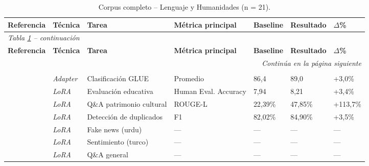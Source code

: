 \begin{longtable}{p{3.5cm} p{1.7cm} p{3.0cm} p{1.8cm} p{1.3cm} p{1.3cm} p{0.9cm}}
\caption{Corpus completo -- Lenguaje y Humanidades (n = 21).} \label{tab:apx_lh} \\
\toprule
\scriptsize\textbf{Referencia} & \scriptsize\textbf{Técnica} & \scriptsize\textbf{Tarea} & \scriptsize\textbf{Métrica principal} & \scriptsize\textbf{Baseline} & \scriptsize\textbf{Resultado} & \scriptsize\textbf{$\Delta$\%} \\
\midrule
\endfirsthead
\multicolumn{7}{l}{\scriptsize\textit{Tabla \ref{tab:apx_lh} -- continuación}} \\[2pt]
\toprule
\scriptsize\textbf{Referencia} & \scriptsize\textbf{Técnica} & \scriptsize\textbf{Tarea} & \scriptsize\textbf{Métrica principal} & \scriptsize\textbf{Baseline} & \scriptsize\textbf{Resultado} & \scriptsize\textbf{$\Delta$\%} \\
\midrule
\endhead
\midrule
\multicolumn{7}{r}{\scriptsize\textit{Continúa en la página siguiente}} \\
\endfoot
\bottomrule
\endlastfoot
\multicolumn{7}{l}{\scriptsize\textbf{\textit{PEFT}}} \\[2pt]
\scriptsize\autocite{chen2025adaptforever} & \scriptsize\textit{Adapter} & \scriptsize Clasificación GLUE & \scriptsize Promedio & \scriptsize 86,4 & \scriptsize 89,0 & \scriptsize +3,0\% \\
\scriptsize\autocite{anghel2025courseeval} & \scriptsize\textit{LoRA} & \scriptsize Evaluación educativa & \scriptsize Human Eval. Accuracy & \scriptsize 7,94 & \scriptsize 8,21 & \scriptsize +3,4\% \\
\scriptsize\autocite{chen2025ft} & \scriptsize\textit{LoRA} & \scriptsize Q\&A patrimonio cultural & \scriptsize ROUGE-L & \scriptsize 22,39\% & \scriptsize 47,85\% & \scriptsize +113,7\% \\
\scriptsize\autocite{han2025ft} & \scriptsize\textit{LoRA} & \scriptsize Detección de duplicados & \scriptsize F1 & \scriptsize 82,02\% & \scriptsize 84,90\% & \scriptsize +3,5\% \\
\scriptsize\autocite{harris2025benchmark} & \scriptsize\textit{LoRA} & \scriptsize Fake news (urdu) & \scriptsize --- & \scriptsize --- & \scriptsize --- & \scriptsize --- \\
\scriptsize\autocite{kiziltepe2025ft} & \scriptsize\textit{LoRA} & \scriptsize Sentimiento (turco) & \scriptsize --- & \scriptsize --- & \scriptsize --- & \scriptsize --- \\
\scriptsize\autocite{li2025keft} & \scriptsize\textit{LoRA} & \scriptsize Q\&A general & \scriptsize --- & \scriptsize --- & \scriptsize --- & \scriptsize --- \\

\end{longtable}
